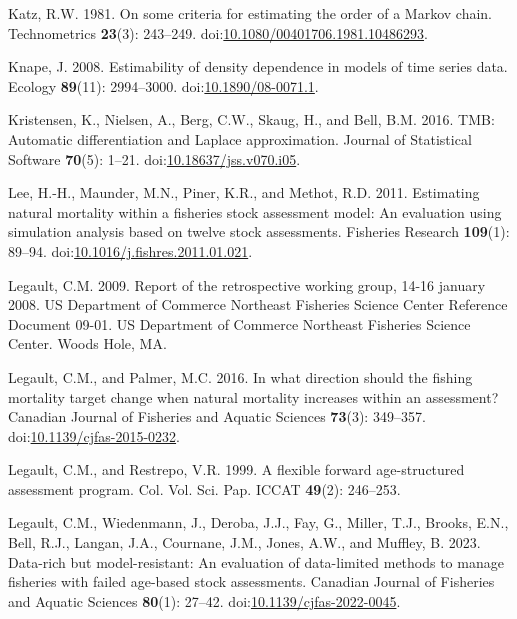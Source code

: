 \documentclass[
  12pt,
]{article}
\newlength{\cslhangindent}
\newlength{\cslentryspacingunit} %
\newenvironment{CSLReferences}[2] %
 {%
  \setlength{\parindent}{0pt}
  \ifodd #1
  \let\oldpar\par
  \def\par{\hangindent=\cslhangindent\oldpar}
  \fi
  \setlength{\parskip}{#2\cslentryspacingunit}
 }%
 {}
\begin{document}
\begin{CSLReferences}{1}{0}
\leavevmode{}%
Katz, R.W. 1981. On some criteria for estimating the order of a {M}arkov
chain. Technometrics \textbf{23}(3): 243--249.
doi:\href{https://doi.org/10.1080/00401706.1981.10486293}{10.1080/00401706.1981.10486293}.

\leavevmode{}%
Knape, J. 2008. Estimability of density dependence in models of time
series data. Ecology \textbf{89}(11): 2994--3000.
doi:\href{https://doi.org/10.1890/08-0071.1}{10.1890/08-0071.1}.

\leavevmode{}%
Kristensen, K., Nielsen, A., Berg, C.W., Skaug, H., and Bell, B.M. 2016.
{TMB}: Automatic differentiation and {L}aplace approximation. Journal of
Statistical Software \textbf{70}(5): 1--21.
doi:\href{https://doi.org/10.18637/jss.v070.i05}{10.18637/jss.v070.i05}.

\leavevmode{}%
Lee, H.-H., Maunder, M.N., Piner, K.R., and Methot, R.D. 2011.
Estimating natural mortality within a fisheries stock assessment model:
An evaluation using simulation analysis based on twelve stock
assessments. Fisheries Research \textbf{109}(1): 89--94.
doi:\href{https://doi.org/10.1016/j.fishres.2011.01.021}{10.1016/j.fishres.2011.01.021}.

\leavevmode{}%
Legault, C.M. 2009. Report of the retrospective working group, 14-16
january 2008. US Department of Commerce Northeast Fisheries Science
Center Reference Document 09-01. US Department of Commerce Northeast
Fisheries Science Center. Woods Hole, MA.

\leavevmode{}%
Legault, C.M., and Palmer, M.C. 2016. In what direction should the
fishing mortality target change when natural mortality increases within
an assessment? Canadian Journal of Fisheries and Aquatic Sciences
\textbf{73}(3): 349--357.
doi:\href{https://doi.org/10.1139/cjfas-2015-0232}{10.1139/cjfas-2015-0232}.

\leavevmode{}%
Legault, C.M., and Restrepo, V.R. 1999. A flexible forward
age-structured assessment program. Col. Vol. Sci. Pap. ICCAT
\textbf{49}(2): 246--253.

\leavevmode{}%
Legault, C.M., Wiedenmann, J., Deroba, J.J., Fay, G., Miller, T.J.,
Brooks, E.N., Bell, R.J., Langan, J.A., Cournane, J.M., Jones, A.W., and
Muffley, B. 2023. Data-rich but model-resistant: An evaluation of
data-limited methods to manage fisheries with failed age-based stock
assessments. Canadian Journal of Fisheries and Aquatic Sciences
\textbf{80}(1): 27--42.
doi:\href{https://doi.org/10.1139/cjfas-2022-0045}{10.1139/cjfas-2022-0045}.


\end{CSLReferences}
\end{document}
